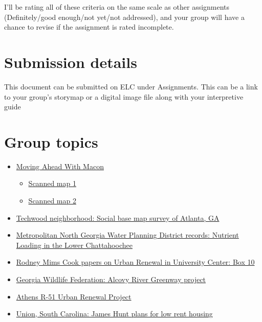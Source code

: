 \documentclass[
  letterpaper,
  DIV=11,
  numbers=noendperiod]{scrartcl}
\begin{document}
I'll be rating all of these criteria on the same scale as other
assignments (Definitely/good enough/not yet/not addressed), and your
group will have a chance to revise if the assignment is rated
incomplete.~

\section{Submission details}\label{submission-details}

This document can be submitted on ELC under Assignments. This can be a
link to your group's storymap or a digital image file along with your
interpretive guide

\section{Group topics}\label{group-topics}

\begin{itemize}
\item
  \href{https://galileo-uga.primo.exlibrisgroup.com/discovery/fulldisplay?docid=alma9910300523902959&context=L&vid=01GALI_UGA:UGA&lang=en&search_scope=MyInstitution&adaptor=Local\%20Search\%20Engine&tab=LibraryCatalog&query=any,contains,moving\%20ahead\%20with\%20macon\%20&sortby=rank&facet=library,include,2959\%E2\%80\%93530589490002959}{Moving
  Ahead With Macon}

  \begin{itemize}
  \item
    \href{https://github.com/jshannon75/geog4636_mapsandthecity/blob/main/items/MovingAheadWithMacon_map1.pdf}{Scanned
    map 1}
  \item
    \href{https://github.com/jshannon75/geog4636_mapsandthecity/blob/main/items/MovingAheadWithMacon_map2.pdf}{Scanned
    map 2}
  \end{itemize}
\item
  \href{https://dlg.usg.edu/record/gsu_planatl_22866?canvas=22&x=555&y=755&w=2927}{Techwood
  neighborhood: Social base map survey of Atlanta, GA}
\item
  \href{https://sclfind.libs.uga.edu/catalog/ms4069_aspace_ref83_bqh}{Metropolitan
  North Georgia Water Planning District records: Nutrient Loading in the
  Lower Chattahoochee}
\item
  \href{https://sclfind.libs.uga.edu/catalog/RBRL180RMC_aspace_ref209_no2}{Rodney
  Mims Cook papers on Urban Renewal in University Center: Box 10}
\item
  \href{https://sclfind.libs.uga.edu/catalog/ms3995_aspace_ref325_i9w}{Georgia
  Wildlife Federation: Alcovy River Greenway project}
\item
  \href{https://dlg.usg.edu/record/guan_1633_014c-001?canvas=0&x=400&y=400&w=1986}{Athens
  R-51 Urban Renewal Project}
\item
  \href{https://sclfind.libs.uga.edu/catalog/ms2901_aspace_ref2200_y3m}{Union,
  South Carolina: James Hunt plans for low rent housing}
\end{itemize}
\end{document}
